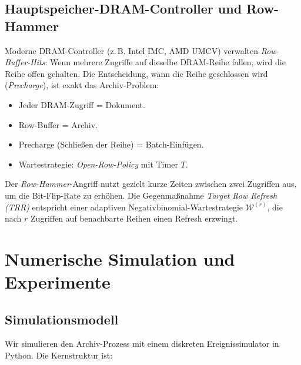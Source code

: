 ﻿\documentclass[12pt, a4paper]{article}
\begin{document}
\subsection{Hauptspeicher-DRAM-Controller und Row-Hammer}

Moderne DRAM-Controller (z.\,B. Intel IMC, AMD UMCV) verwalten
\emph{Row-Buffer-Hits}: Wenn mehrere Zugriffe auf dieselbe DRAM-Reihe fallen,
wird die Reihe offen gehalten. Die Entscheidung, wann die Reihe geschlossen
wird (\emph{Precharge}), ist exakt das Archiv-Problem:
\begin{itemize}[noitemsep]
  \item Jeder DRAM-Zugriff = Dokument.
  \item Row-Buffer = Archiv.
  \item Precharge (Schließen der Reihe) = Batch-Einfügen.
  \item Wartestrategie: \emph{Open-Row-Policy} mit Timer $T$.
\end{itemize}

Der \emph{Row-Hammer}-Angriff nutzt gezielt kurze Zeiten zwischen zwei
Zugriffen aus, um die Bit-Flip-Rate zu erhöhen. Die Gegenmaßnahme
\emph{Target Row Refresh (TRR)} entspricht einer adaptiven
Negativbinomial-Wartestrategie $\mathcal{W}^{(r)}$, die nach $r$ Zugriffen
auf benachbarte Reihen einen Refresh erzwingt.

\section{Numerische Simulation und Experimente}\label{sec:simulation}

\subsection{Simulationsmodell}

Wir simulieren den Archiv-Prozess mit einem diskreten Ereignissimulator in
Python. Die Kernstruktur ist:
\end{document}
